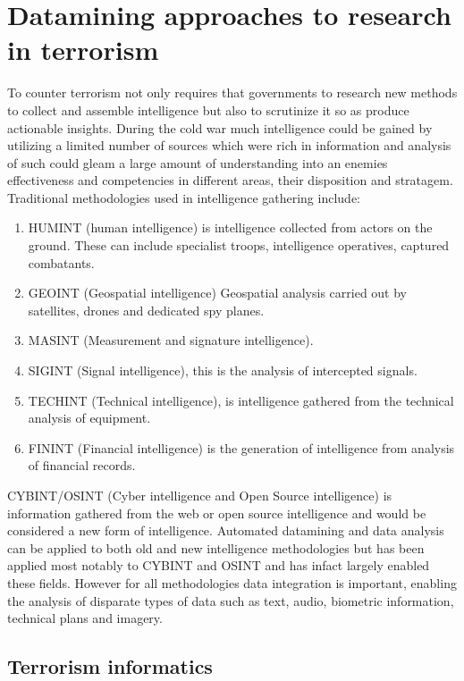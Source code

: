 \chapter[Datamining approaches to research in terrorism]{Datamining approaches to research in terrorism}

To counter terrorism not only requires that governments to research new methods to collect and assemble intelligence but also to scrutinize it so as produce actionable insights. During the cold war much intelligence could be gained by utilizing a limited number of sources which were rich in information and analysis of such could gleam a large amount of understanding into an enemies effectiveness and competencies in different areas, their disposition and stratagem. Traditional methodologies used in intelligence gathering include:
\begin{enumerate}
\item HUMINT (human intelligence) is intelligence collected from actors on the ground. These can include specialist troops, intelligence operatives, captured combatants.
\item GEOINT (Geospatial intelligence) Geospatial analysis carried out by satellites, drones and dedicated spy planes.
\item MASINT (Measurement and signature intelligence).
\item SIGINT (Signal intelligence), this is the analysis of intercepted signals.
\item TECHINT (Technical intelligence), is intelligence gathered from the technical analysis of equipment.
\item FININT  (Financial intelligence) is the generation of intelligence  from analysis of financial records.
\end{enumerate}
CYBINT/OSINT (Cyber intelligence and Open Source intelligence) is information gathered from the web or open source intelligence and would be considered a new form of intelligence. Automated datamining and data analysis can be applied to both old and new  intelligence methodologies but has been applied most notably to CYBINT and OSINT and has infact largely enabled these fields.
However for all methodologies data integration is important, enabling the analysis of disparate types of data such as text, audio, biometric information, technical plans and imagery.

\section{Terrorism informatics}

